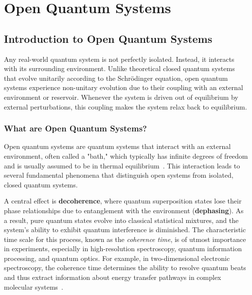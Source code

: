 \chapter{Open Quantum Systems} %
\label{chapter_open_quantum_systems} %


\section{Introduction to Open Quantum Systems}
\label{sec:introduction_open_quantum_systems}

Any real-world quantum system is not perfectly isolated. Instead, it interacts with its surrounding environment. Unlike theoretical closed quantum systems that evolve unitarily according to the Schrödinger equation, open quantum systems experience non-unitary evolution due to their coupling with an external environment or reservoir.
Whenever the system is driven out of equilibrium by external perturbations, this coupling makes the system relax back to equilibrium.
\subsection{What are Open Quantum Systems?}
Open quantum systems are quantum systems that interact with an external environment, often called a "bath," which typically has infinite degrees of freedom and is usually assumed to be in thermal equilibrium~\cite{breuerpetruccione2009theoryopenquantum, weiss2012quantumdissipativesystems}. This interaction leads to several fundamental phenomena that distinguish open systems from isolated, closed quantum systems.

A central effect is \textbf{decoherence}, where quantum superposition states lose their phase relationships due to entanglement with the environment (\textbf{dephasing}). As a result, pure quantum states evolve into classical statistical mixtures, and the system's ability to exhibit quantum interference is diminished. The characteristic time scale for this process, known as the \emph{coherence time}, is of utmost importance in experiments, especially in high-resolution spectroscopy, quantum information processing, and quantum optics. For example, in two-dimensional electronic spectroscopy, the coherence time determines the ability to resolve quantum beats and thus extract information about energy transfer pathways in complex molecular systems~\cite{mukamel1995principlesnonlinearoptical}.

